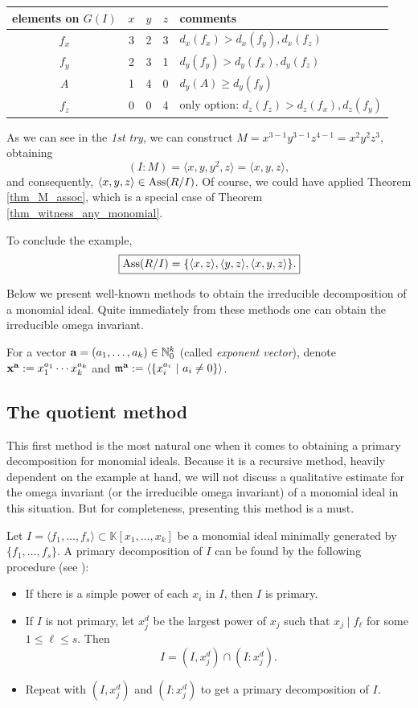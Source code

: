 \documentclass[11pt]{amsart}   %
\begin{document}
\begin{exm}
\begin{tabular}{c|c|c|c|l}
elements on $G(I)$ & $x$ & $y$ & $z$ & comments\\\hline
$f_x$ & 3 & 2 & 3 & $d_x(f_x)>d_x(f_y), d_x(f_z)$\\\hline
$f_y$ & 2 & 3 & 1 & $d_y(f_y)>d_y(f_x),d_y(f_z)$\\\hline
$A$ & 1 & 4 & 0 & $d_y(A)\geq d_y(f_y)$\\\hline
$f_z$ & 0 & 0 & 4& only option: $d_z(f_z)>d_z(f_x), d_z(f_y)$    
\end{tabular}

\medskip

As we can see in the {\em 1st try}, we can construct $M=x^{3-1}y^{3-1}z^{4-1}=x^2y^2z^3$, obtaining $$(I:M)=\langle x,y,y^2,z\rangle=\langle x,y,z\rangle,$$ and consequently, $\langle x,y,z\rangle\in {\rm Ass}(R/I)$. Of course, we could have applied Theorem \ref{thm_M_assoc}, which is a special case of Theorem \ref{thm_witness_any_monomial}.

To conclude the example, $$\boxed{{\rm Ass}(R/I)=\{\langle x,z\rangle, \langle y,z\rangle, \langle x,y,z\rangle\}.}$$
\end{exm}

\bigskip


Below we present well-known methods to obtain the irreducible decomposition of a monomial ideal. Quite immediately from these methods one can obtain the irreducible omega invariant. 

For a vector ${\bf a}=(a_1,\ldots,a_k)\in\mathbb N_0^{k}$ (called {\em exponent vector}), denote ${\bf x}^{\bf a}:=x_1^{a_1}\cdots x_k^{a_k}$ and $\frak m^{\bf a}:=\langle \{x_i^{a_i}~|~a_i\neq 0\}\rangle$.


\subsection{The quotient method}\label{sec_quotientl} This first method is the most natural one when it comes to obtaining a primary decomposition for monomial ideals. Because it is a recursive method, heavily dependent on the example at hand, we will not discuss a qualitative estimate for the omega invariant (or the irreducible omega invariant) of a monomial ideal in this situation. But for completeness, presenting this method is a must.

Let $I=\langle f_1,\ldots,f_s\rangle \subset {\mathbb K}[x_1,\ldots,x_k]$ be a monomial ideal minimally generated by $\{f_1,\ldots,f_s\}$. A primary decomposition of $I$ can be found by the following procedure (see \cite[Algorithm 3.28]{Va}):
\begin{itemize}
    \item If there is a simple power of each $x_i$ in $I$, then $I$ is primary.
    \item If $I$ is not primary, let $x_j^d$ be the largest power of $x_j$ such that $x_j\mid f_\ell$ for some $1\leq \ell\leq s$.  Then
    $$I=(I,x_j^d)\cap (I:x_j^d).$$
    \item Repeat with $(I,x_j^d)$ and $(I:x_j^d)$ to get a primary decomposition of $I$.
\end{itemize}
\end{document}
